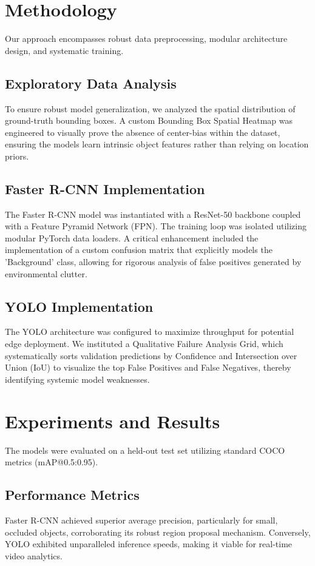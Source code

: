 \documentclass[conference]{IEEEtran}
\begin{document}
\section{Methodology}
Our approach encompasses robust data preprocessing, modular architecture design, and systematic training.

\subsection{Exploratory Data Analysis}
To ensure robust model generalization, we analyzed the spatial distribution of ground-truth bounding boxes. A custom Bounding Box Spatial Heatmap was engineered to visually prove the absence of center-bias within the dataset, ensuring the models learn intrinsic object features rather than relying on location priors.

\subsection{Faster R-CNN Implementation}
The Faster R-CNN model was instantiated with a ResNet-50 backbone coupled with a Feature Pyramid Network (FPN). The training loop was isolated utilizing modular PyTorch data loaders. A critical enhancement included the implementation of a custom confusion matrix that explicitly models the 'Background' class, allowing for rigorous analysis of false positives generated by environmental clutter.

\subsection{YOLO Implementation}
The YOLO architecture was configured to maximize throughput for potential edge deployment. We instituted a Qualitative Failure Analysis Grid, which systematically sorts validation predictions by Confidence and Intersection over Union (IoU) to visualize the top False Positives and False Negatives, thereby identifying systemic model weaknesses.

\section{Experiments and Results}
The models were evaluated on a held-out test set utilizing standard COCO metrics (mAP@0.5:0.95). 

\subsection{Performance Metrics}
Faster R-CNN achieved superior average precision, particularly for small, occluded objects, corroborating its robust region proposal mechanism. Conversely, YOLO exhibited unparalleled inference speeds, making it viable for real-time video analytics.
\end{document}
